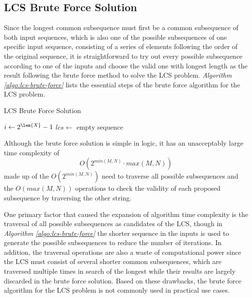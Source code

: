\documentclass[sigplan,screen]{acmart}
\begin{document}

\subsection{LCS Brute Force Solution}
\label{section:lcs-brute-force}

Since the longest common subsequence must first be a common subsequence of both input sequences, which is also one of the possible subsequences of one specific input sequence, consisting of a series of elements following the order of the original sequence, it is straightforward to try out every possible subsequence according to one of the inputs and choose the valid one with longest length as the result following the brute force method to solve the LCS problem. \cite{bergrothSurveyLongestCommon2000, hirschbergLinearSpaceAlgorithm1975, patersonLongestCommonSubsequences1994} \textit{Algorithm \ref{algo:lcs-brute-force}} lists the essential steps of the brute force algorithm for the LCS problem.

\begin{algorithm}
    \caption{LCS Brute Force Solution}
    \label{algo:lcs-brute-force}
    $i \gets 2 ^ {\len{X}} - 1$ \;
    $lcs \gets$ empty sequence \;
\end{algorithm}

Although the brute force solution is simple in logic, it has an unacceptably large time complexity of $$O(2^{min(M, N)} \cdot max(M, N))$$ made up of the $O(2^{min(M, N)})$ need to traverse all possible subsequences and the $O(max(M, N))$ operations to check the validity of each proposed subsequence by traversing the other string.

One primary factor that caused the expansion of algorithm time complexity is the traversal of all possible subsequences as candidates of the LCS, though in \textit{Algorithm \ref{algo:lcs-brute-force}} the shorter sequence in the inputs is used to generate the possible subsequences to reduce the number of iterations. In addition, the traversal operations are also a waste of computational power since the LCS must consist of several shorter common subsequences, which are traversed multiple times in search of the longest while their results are largely discarded in the brute force solution. Based on these drawbacks, the brute force algorithm for the LCS problem is not commonly used in practical use cases. \cite{bergrothSurveyLongestCommon2000, patersonLongestCommonSubsequences1994}
\end{document}
